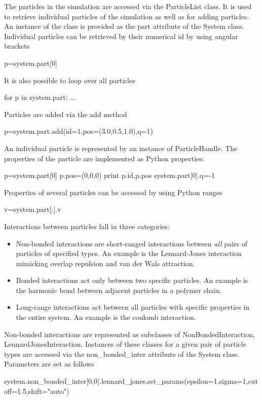 The particles in the simulation are accessed via the ParticleList class. It is used to retrieve individual particles of the simulation as well as for adding particles.
An instance of the class is provided as the part attribute of the System class.
Individual particles can be retrieved by their numerical id by using angular brackets
\begin{pypresso}
p=system.part[0]
\end{pypresso}
It is also possible to loop over all particles
\begin{pypresso}
for p in system.part:
    ...
\end{pypresso}
Particles are added via the add method
\begin{pypresso}
p=system.part.add(id=1,pos=(3.0,0.5,1.0),q=1)
\end{pypresso}
An individual particle is represented by an instance of ParticleHandle.
The properties of the particle are implemented as Python properties:
\begin{pypresso}
p=system.part[0]
p.pos=(0,0,0)
print p.id,p.pos
system.part[0].q=-1
\end{pypresso}
Properties of several particles can be accessed by using Python ranges
\begin{pypresso}
v=system.part[:].v
\end{pypresso}

Interactions between particles fall in three categories:
\begin{itemize}
\item Non-bonded interactions are short-ranged interactions between \emph{all} pairs of particles of specified types. An example is the Lennard-Jones interaction mimicking overlap repulsion and van der Wals attraction. 
\item Bonded interactions act only between two specific particles. An example is the harmonic bond between adjacent particles in a polymer chain.
\item Long-range interactions act between all particles with specific properties in the entire system. An example is the coulomb interaction.
\end{itemize}

Non-bonded interactions are represented as subclasses of NonBondedInteraction, \eg LennardJonesInteraction. Instances of these classes for a given pair of particle types are accessed via the non_bonded_inter attribute of the System class. Parameters are set as follows
\begin{pypresso}
system.non_bonded_inter[0,0].lennard_jones.set_params(epsilon=1,sigma=1,cutoff=1.5,shift="auto")
\end{pypresso}



